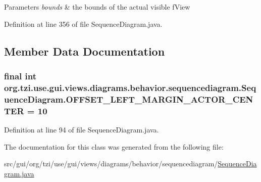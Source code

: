 \begin{DoxyParams}{Parameters}
{\em bounds} & the bounds of the actual visible f\-View \\
\hline
\end{DoxyParams}


Definition at line 356 of file Sequence\-Diagram.\-java.



\subsection{Member Data Documentation}
\hypertarget{classorg_1_1tzi_1_1use_1_1gui_1_1views_1_1diagrams_1_1behavior_1_1sequencediagram_1_1_sequence_diagram_a8755f9a3f30dcbd41c47d5bd0b2645eb}{
\subsubsection[{O\-F\-F\-S\-E\-T\-\_\-\-L\-E\-F\-T\-\_\-\-M\-A\-R\-G\-I\-N\-\_\-\-A\-C\-T\-O\-R\-\_\-\-C\-E\-N\-T\-E\-R}]{\setlength{\rightskip}{0pt plus 5cm}final int org.\-tzi.\-use.\-gui.\-views.\-diagrams.\-behavior.\-sequencediagram.\-Sequence\-Diagram.\-O\-F\-F\-S\-E\-T\-\_\-\-L\-E\-F\-T\-\_\-\-M\-A\-R\-G\-I\-N\-\_\-\-A\-C\-T\-O\-R\-\_\-\-C\-E\-N\-T\-E\-R = 10\hspace{0.3cm}{\ttfamily [static]}}}\label{classorg_1_1tzi_1_1use_1_1gui_1_1views_1_1diagrams_1_1behavior_1_1sequencediagram_1_1_sequence_diagram_a8755f9a3f30dcbd41c47d5bd0b2645eb}


Definition at line 94 of file Sequence\-Diagram.\-java.



The documentation for this class was generated from the following file\-:\begin{DoxyCompactItemize}
\item 
src/gui/org/tzi/use/gui/views/diagrams/behavior/sequencediagram/\hyperlink{_sequence_diagram_8java}{Sequence\-Diagram.\-java}\end{DoxyCompactItemize}
